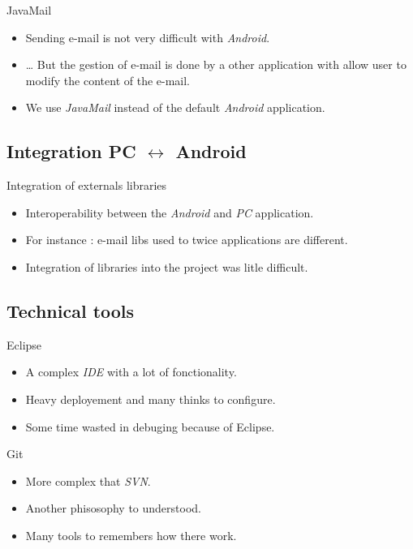 \documentclass{beamer}
\begin{document}
\begin{frame}[JavaMail]
\begin{block}{JavaMail}
\begin{itemize}
\pause \item Sending e-mail is not very difficult with \emph{Android}.
\pause \item … But the gestion of e-mail is done by a other application \pause with allow user to modify the content of the e-mail.
\pause \item \textrightarrow We use \emph{JavaMail} instead of the default \emph{Android} application.
\end{itemize}
\end{block}
\end{frame}

\subsection{Integration  PC $\leftrightarrow$ Android}
\begin{frame}
\begin{block}{Integration of externals libraries}
\begin{itemize}
\pause \item Interoperability between the \emph{Android} and \emph{PC} application.
\pause \item For instance : e-mail libs used to twice applications are different.
\pause \item Integration of libraries into the project was litle difficult.
\end{itemize}
\end{block}
\end{frame}

\subsection{Technical tools}
\begin{frame}
\begin{block}{Eclipse}
\begin{itemize}
\pause \item A complex \emph{IDE} with a lot of fonctionality.
\pause \item Heavy deployement and many thinks to configure.
\pause \item Some time wasted in debuging because of Eclipse.
\end{itemize}
\end{block}
\pause 
\begin{block}{Git}
\begin{itemize}
\pause \item More complex that \emph{SVN}.
\pause \item Another phisosophy to understood. 
\pause \item Many tools to remembers how there work.
\end{itemize}
\end{block}
\end{frame}
\end{document}
